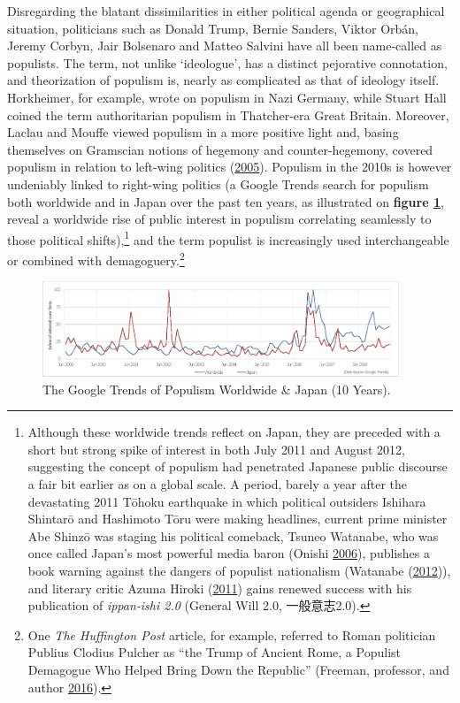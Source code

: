 \documentclass[10pt,british,A4paper,oneside]{memoir}
\begin{document}
Disregarding the blatant dissimilarities in either political agenda or
geographical situation, politicians such as Donald Trump, Bernie
Sanders, Viktor Orbán, Jeremy Corbyn, Jair Bolsenaro and Matteo Salvini
have all been name-called as populists. The term, not unlike
`ideologue', has a distinct pejorative connotation, and theorization of
populism is, nearly as complicated as that of ideology itself.
Horkheimer, for example, wrote on populism in Nazi Germany, while Stuart
Hall coined the term authoritarian populism in Thatcher-era Great
Britain. Moreover, Laclau and Mouffe viewed populism in a more positive
light and, basing themselves on Gramscian notions of hegemony and
counter-hegemony, covered populism in relation to left-wing politics
(\protect\hyperlink{ref-laclau_populist_2005}{2005}). Populism in the
2010s is however undeniably linked to right-wing politics (a Google
Trends search for populism both worldwide and in Japan over the past ten
years, as illustrated on \textbf{figure \ref{fig:populismtrends}},
reveal a worldwide rise of public interest in populism correlating
seamlessly to those political shifts),\footnote{Although these worldwide
  trends reflect on Japan, they are preceded with a short but strong
  spike of interest in both July 2011 and August 2012, suggesting the
  concept of populism had penetrated Japanese public discourse a fair
  bit earlier as on a global scale. A period, barely a year after the
  devastating 2011 Tōhoku earthquake in which political outsiders
  Ishihara Shintarō and Hashimoto Tōru were making headlines, current
  prime minister Abe Shinzō was staging his political comeback, Tsuneo
  Watanabe, who was once called Japan's most powerful media baron
  (Onishi \protect\hyperlink{ref-onishi_shadow_2006}{2006}), publishes a
  book warning against the dangers of populist nationalism (Watanabe
  (\protect\hyperlink{ref-watanabe_anti-populism_2012}{2012})), and
  literary critic Azuma Hiroki
  (\protect\hyperlink{ref-azuma_ippan_2011}{2011}) gains renewed success
  with his publication of \emph{ippan-ishi 2.0} (General Will 2.0,
  一般意志2.0).} and the term populist is increasingly used
interchangeable or combined with demagoguery.\footnote{One \emph{The
  Huffington Post} article, for example, referred to Roman politician
  Publius Clodius Pulcher as ``the Trump of Ancient Rome, a Populist
  Demagogue Who Helped Bring Down the Republic'' (Freeman, professor,
  and author \protect\hyperlink{ref-freeman_meet_2016}{2016}).}

\begin{figure}[!htb]
 \centering
 \caption{\label{fig:populismtrends} The Google Trends of Populism Worldwide \& Japan (10 Years).}
 \includegraphics[width=0.95\textwidth,trim=4 4 4 4,clip]{images/populismtrends.eps}\end{figure}
\end{document}
